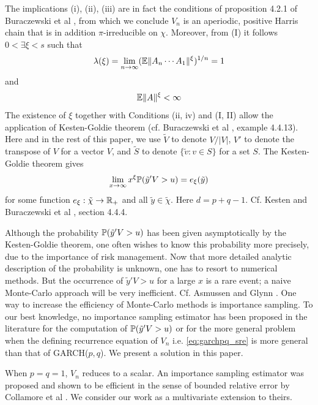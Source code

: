 \documentclass[aoas,preprint]{imsart}
\numberwithin{equation}{section}
\theoremstyle{plain}
\begin{document}
The implications (i), (ii), (iii) are in fact the conditions of
proposition 4.2.1 of Buraczewski et al
\cite{buraczewski:damek:mikosch:2016}, from which we conclude $V_n$ is
an aperiodic, positive Harris chain that is in addition
$\pi$-irreducible on $\chi$.
Moreover, from (I) it follows $0 < \exists \xi < s$ such that
\begin{equation}
  \label{eq:hyt}
  \lambda(\xi) = \lim_{n \to \infty} (\E \|A_n \cdots A_1\|^\xi)^{1/n} = 1
\end{equation}
and
\begin{equation}
  \label{eq:jui}
  \E \|A\|^\xi < \infty
\end{equation}
The existence of $\xi$ together with Conditions (ii, iv) and (I, II)
allow the application of Kesten-Goldie theorem (cf. Buraczewski et al
\cite{buraczewski:damek:mikosch:2016}, example 4.4.13). Here and in
the rest of this paper, we use $\tilde V$ to denote $V/|V|$, $V'$ to
denote the transpose of $V$ for a vector $V$,
and $\tilde S$ to denote $\{\tilde v: v \in S\}$ for a set $S$.
The Kesten-Goldie theorem gives
\begin{equation}
  \label{eq:kesten}
  \lim_{x \to \infty} x^{\xi} \P(\tilde y' V > u) = e_\xi(\tilde y)  
\end{equation}
for some function $e_\xi: \tilde \chi \to \reals_+$ and
all $\tilde y \in \tilde \chi$. Here $d = p + q - 1$. Cf. Kesten
\cite{kesten:1973} and  Buraczewski et al
\cite{buraczewski:damek:mikosch:2016},
section 4.4.4.

Although the probability $\P(\tilde y' V > u)$ has been given
asymptotically by the Kesten-Goldie theorem, one often wishes to know
this probability more precisely, due to the importance of risk
management. Now that more detailed analytic description of the
probability is unknown, one has to resort to numerical methods. But
the occurrence of $\tilde y' V > u$ for a large $x$ is a rare event; a
naive Monte-Carlo approach will be very inefficient. Cf. Asmussen and
Glynn \cite{opac-b1123521}.
One way to increase the efficiency of Monte-Carlo methods is
importance sampling. To our best knowledge, no importance sampling
estimator has been proposed in the literature for the computation of
$\P(\tilde y' V > u)$ or for the more general problem when the
defining recurrence equation of $V_n$ i.e. \eqref{eq:garchpq_sre} is 
more general than that of GARCH($p, q$). We present a solution in this
paper.

When $p = q = 1$, $V_n$ reduces to a scalar. An importance sampling
estimator was proposed and shown to be efficient in the sense of
bounded relative error by Collamore et al \cite{collamore2014}. We
consider our work as a multivariate extension to theirs.
\end{document}
